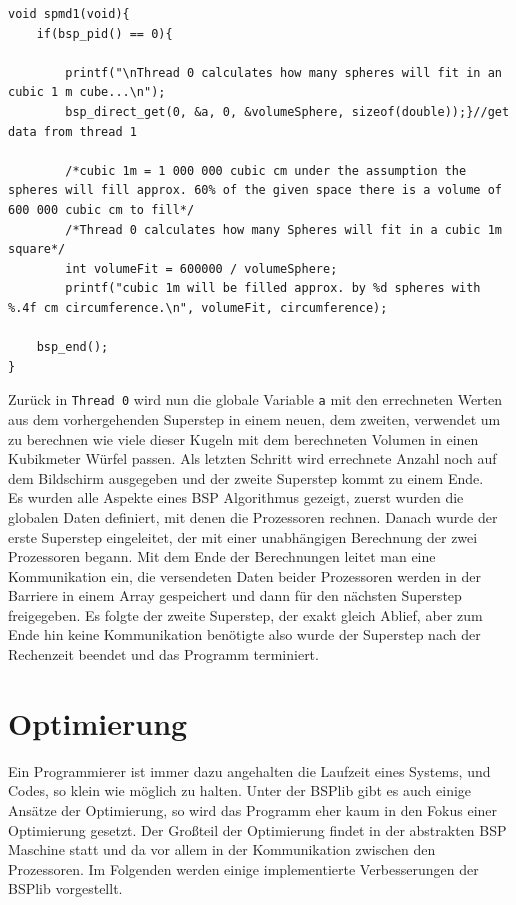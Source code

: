 \documentclass[a4paper,10pt]{scrartcl}
\begin{document}
\begin{lstlisting}
void spmd1(void){
	if(bsp_pid() == 0){
    
	    printf("\nThread 0 calculates how many spheres will fit in an cubic 1 m cube...\n");                 
        bsp_direct_get(0, &a, 0, &volumeSphere, sizeof(double));}//get data from thread 1     
    
        /*cubic 1m = 1 000 000 cubic cm under the assumption the spheres will fill approx. 60% of the given space there is a volume of 600 000 cubic cm to fill*/
        /*Thread 0 calculates how many Spheres will fit in a cubic 1m square*/
        int volumeFit = 600000 / volumeSphere;
        printf("cubic 1m will be filled approx. by %d spheres with %.4f cm circumference.\n", volumeFit, circumference);
    
    bsp_end();
}
\end{lstlisting}
Zurück in \texttt{Thread 0} wird nun die globale Variable \texttt{a} mit den errechneten Werten aus dem vorhergehenden Superstep in einem neuen, dem	 zweiten,  verwendet um zu berechnen wie viele dieser Kugeln mit dem berechneten Volumen in einen Kubikmeter Würfel passen. Als letzten Schritt wird errechnete Anzahl noch auf dem Bildschirm ausgegeben und der zweite Superstep kommt zu einem Ende.	\\ 

Es wurden alle Aspekte eines BSP Algorithmus gezeigt, zuerst wurden die globalen Daten definiert, mit denen die Prozessoren rechnen. Danach wurde der erste Superstep eingeleitet, der mit einer unabhängigen Berechnung der zwei Prozessoren begann. Mit dem Ende der Berechnungen leitet man eine Kommunikation ein, die versendeten Daten beider Prozessoren werden in der Barriere in einem Array gespeichert und dann für den nächsten Superstep freigegeben. Es folgte der zweite Superstep, der exakt gleich Ablief, aber zum Ende hin keine Kommunikation benötigte also wurde der Superstep nach der Rechenzeit beendet und das Programm terminiert.
\newpage

\section{Optimierung}
Ein Programmierer ist immer dazu angehalten die Laufzeit eines Systems, und Codes, so klein wie möglich zu halten. Unter der BSPlib gibt es auch einige Ansätze der Optimierung, so wird das Programm eher kaum in den Fokus einer Optimierung gesetzt. Der Großteil der Optimierung findet in der abstrakten BSP Maschine statt und da vor allem in der Kommunikation zwischen den Prozessoren. Im Folgenden werden einige implementierte Verbesserungen der BSPlib vorgestellt.
\end{document}
